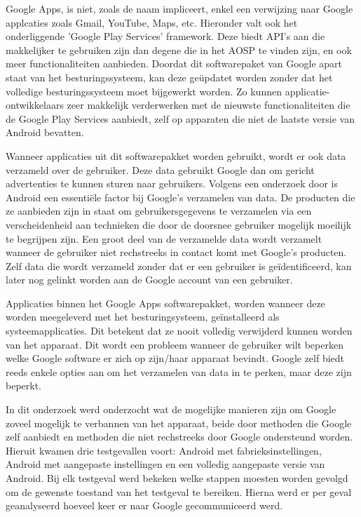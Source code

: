 Google Apps, is niet, zoals de naam impliceert, enkel een verwijzing naar Google applcaties zoals Gmail, YouTube, Maps, etc. Hieronder valt ook het onderliggende 'Google Play Services' framework. Deze biedt API's aan die makkelijker te gebruiken zijn dan degene die in het AOSP te vinden zijn, en ook meer functionaliteiten aanbieden. Doordat dit softwarepaket van Google apart staat van het besturingssysteem, kan deze geüpdatet worden zonder dat het volledige besturingssysteem moet bijgewerkt worden. Zo kunnen applicatie-ontwikkelaars zeer makkelijk verderwerken met de nieuwste functionaliteiten die de Google Play Services aanbiedt, zelf op apparaten die niet de laatste versie van Android bevatten.

Wanneer applicaties uit dit softwarepakket worden gebruikt, wordt er ook data verzameld over de gebruiker. Deze data gebruikt Google dan om gericht advertenties te kunnen sturen naar gebruikers. Volgens een onderzoek door \cite{schmidt_google-data-collection} is Android een essentiële factor bij Google's verzamelen van data. De producten die ze aanbieden zijn in staat om gebruikersgegevens te verzamelen via een verscheidenheid aan technieken die door de doorsnee gebruiker mogelijk moeilijk te begrijpen zijn. Een groot deel van de verzamelde data wordt verzamelt wanneer de gebruiker niet rechstreeks in contact komt met Google's producten. Zelf data die wordt verzameld zonder dat er een gebruiker is geïdentificeerd, kan later nog gelinkt worden aan de Google account van een gebruiker.

Applicaties binnen het Google Apps softwarepakket, worden wanneer deze worden meegeleverd met het besturingsysteem, geïnstalleerd als systeemapplicaties. Dit betekent dat ze nooit volledig verwijderd kunnen worden van het apparaat. Dit wordt een probleem wanneer de gebruiker wilt beperken welke Google software er zich op zijn/haar apparaat bevindt. Google zelf biedt reeds enkele opties aan om het verzamelen van data in te perken, maar deze zijn beperkt.

In dit onderzoek werd onderzocht wat de mogelijke manieren zijn om Google zoveel mogelijk te verbannen van het apparaat, beide door methoden die Google zelf aanbiedt en methoden die niet rechstreeks door Google ondersteund worden. Hieruit kwamen drie testgevallen voort: Android met fabrieksinstellingen, Android met aangepaste instellingen en een volledig aangepaste versie van Android. Bij elk testgeval werd bekeken welke stappen moesten worden gevolgd om de gewenste toestand van het testgeval te bereiken. Hierna werd er per geval geanalyseerd hoeveel keer er naar Google gecommuniceerd werd. 

